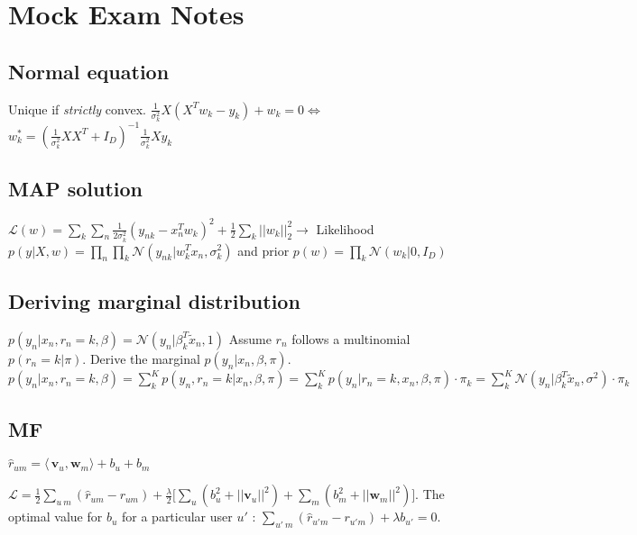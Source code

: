 \newline
\newline
\section{Mock Exam Notes}
\subsection{Normal equation}
Unique if \textit{strictly} convex.\newline
$\frac{1}{\sigma_k^2} X(X^Tw_k-y_k)+w_k = 0 \Leftrightarrow$ \newline
$ w_k^* = (\frac{1}{\sigma_k^2} XX^T+I_D)^{-1} \frac{1}{\sigma_k^2}Xy_k$

\subsection{MAP solution}
$\mathcal{L}(w) = \sum_k \sum_n \frac{1}{2\sigma_k^2} (y_{nk} - x_n^T w_k)^2 + \frac{1}{2} \sum_k ||w_k||^2_2 \rightarrow$
Likelihood $p(y|X,w) = \prod_n \prod_k \mathcal{N}(y_{nk}|w_k^Tx_n, \sigma_k^2)$ and prior $p(w) = \prod_k \mathcal{N}(w_k|0,I_D)$

\subsection{Deriving marginal distribution}
$p(y_n|x_n,r_n=k,\beta) = \mathcal{N} (y_n|\beta_k^T\tilde{x}_n,1)$
Assume $r_n$ follows a multinomial $p(r_n=k|\pi)$. Derive the marginal $p(y_n|x_n,\beta,\pi)$.
$p(y_n|x_n,r_n=k,\beta) = \sum_k^K p(y_n,r_n=k|x_n,\beta,\pi) = \sum_k^K p(y_n|r_n=k,x_n,\beta,\pi) \cdot \pi_k = \sum_k^K \mathcal{N}(y_n|\beta_k^T\tilde{x}_n, \sigma^2)\cdot \pi_k$

\subsection{MF}
$\hat{r}_{um} = \langle\,\mathbf{v}_u,\mathbf{w}_m\rangle + b_u + b_m$

$\mathcal{L} = \frac{1}{2} \sum_{u ~ m}(\hat{r}_{um} -r_{um}) + \frac{\lambda}{2} \big[
\sum_u (b_u^2+||\mathbf{v}_u||^2) + \sum_m (b_m^2+||\mathbf{w}_m||^2) \big]$. The optimal value for $b_u$ for a particular user $u'$ : $\sum_{u' ~ m} (\hat{r}_{u'm} - r_{u'm}) + \lambda b_{u'} = 0$.

